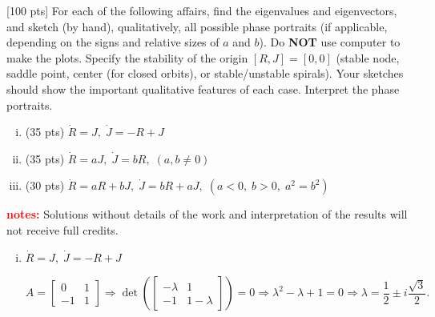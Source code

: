 \documentclass[12pt]{article}
\begin{document}


\begin{ex}
  
  [100 pts] For each of the following affairs, find the eigenvalues and eigenvectors, and sketch (by hand), qualitatively, all possible phase portraits (if applicable, depending on the signs and relative sizes of $a$ and $b$). Do \textbf{NOT} use computer to make the plots. Specify the stability of the origin $[R,J]=[0,0]$ (stable node, saddle point, center (for closed orbits), or stable/unstable spirals). Your sketches should show the important qualitative features of each case. Interpret the phase portraits.
  \begin{enumerate}[(i)]\setlength{\itemsep}{0pt}
  \item (35 pts) $\dot{R}=J,\;\dot{J}=-R+J$
  \item (35 pts) $\dot{R}=aJ,\;\dot{J}=bR,\;(a,b\neq 0)$
  \item (30 pts) $\dot{R}=aR+bJ,\;\dot{J}=bR+aJ,\;(a<0,\;b>0,\;a^2=b^2)$
  \end{enumerate}

\noindent\textbf{\textcolor{red}{notes:} }Solutions without details of the work and interpretation of the results will not receive full credits. 

\begin{solution}
  \begin{enumerate}[(i)]\setlength{\itemsep}{0pt}
  \item $\dot{R}=J,\;\dot{J}=-R+J$

  \begin{equation*}
    A=
    \begin{bmatrix}
      0 & 1\\
      -1 & 1
    \end{bmatrix}
    \Rightarrow \det\left(
    \begin{bmatrix}
      -\lambda & 1\\
      -1 & 1-\lambda
    \end{bmatrix}
    \right)=0\Rightarrow \lambda^2-\lambda+1=0\Rightarrow \lambda=\frac{1}{2}\pm i\frac{\sqrt{3}}{2}.
  \end{equation*}


\end{enumerate}
\end{solution}
\end{ex}
\end{document}

